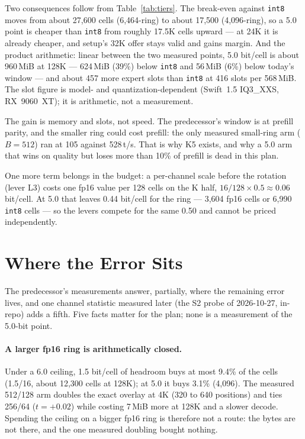 \documentclass[10pt,twocolumn]{article}
\begin{document}
Two consequences follow from Table~\ref{tab:tiers}. The break-even against \texttt{int8} moves from about 27,600 cells (6,464-ring) to about 17,500 (4,096-ring), so a 5.0 point is cheaper than \texttt{int8} from roughly 17.5K cells upward --- at 24K it is already cheaper, and setup's 32K offer stays valid and gains margin. And the product arithmetic: linear between the two measured points, 5.0 bit/cell is about 960\,MiB at 128K --- 624\,MiB (39\%) below \texttt{int8} and 56\,MiB (6\%) below today's window --- and about 457 more expert slots than \texttt{int8} at 416 slots per 568\,MiB. The slot figure is model- and quantization-dependent (Swift~1.5 IQ3\_XXS, RX~9060~XT); it is arithmetic, not a measurement.

The gain is memory and slots, not speed. The predecessor's window is at prefill parity, and the smaller ring could cost prefill: the only measured small-ring arm ($B{=}512$) ran at 105 against 528\,t/s. That is why K5 exists, and why a 5.0 arm that wins on quality but loses more than 10\% of prefill is dead in this plan.

One more term belongs in the budget: a per-channel scale before the rotation (lever L3) costs one fp16 value per 128 cells on the K half, $16/128 \times 0.5 \approx 0.06$ bit/cell. At 5.0 that leaves 0.44 bit/cell for the ring --- 3,604 fp16 cells or 6,990 \texttt{int8} cells --- so the levers compete for the same 0.50 and cannot be priced independently.

\section{Where the Error Sits}\label{sec:error}

The predecessor's measurements answer, partially, where the remaining error lives, and one channel statistic measured later (the S2 probe of 2026-10-27, in-repo) adds a fifth. Five facts matter for the plan; none is a measurement of the 5.0-bit point.

\paragraph{A larger fp16 ring is arithmetically closed.} Under a 6.0 ceiling, 1.5 bit/cell of headroom buys at most 9.4\% of the cells (1.5/16, about 12,300 cells at 128K); at 5.0 it buys 3.1\% (4,096). The measured 512/128 arm doubles the exact overlay at 4K (320 to 640 positions) and ties 256/64 ($t{=}+0.02$) while costing 7\,MiB more at 128K and a slower decode. Spending the ceiling on a bigger fp16 ring is therefore not a route: the bytes are not there, and the one measured doubling bought nothing.
\end{document}
